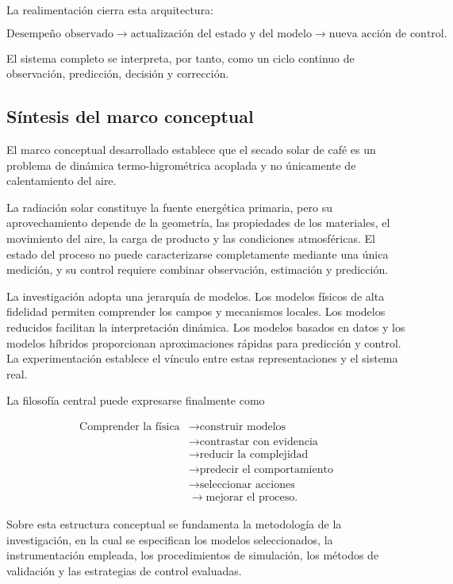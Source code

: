 La realimentación cierra esta arquitectura:

\begin{equation}
\boxed{
\text{Desempeño observado}
\longrightarrow
\text{actualización del estado y del modelo}
\longrightarrow
\text{nueva acción de control}.
}
\end{equation}

El sistema completo se interpreta, por tanto, como un ciclo continuo de observación, predicción, decisión y corrección.

\subsection{Síntesis del marco conceptual}
\label{subsec:sintesis_marco_conceptual}

El marco conceptual desarrollado establece que el secado solar de café es un problema de dinámica termo-higrométrica acoplada y no únicamente de calentamiento del aire.

La radiación solar constituye la fuente energética primaria, pero su aprovechamiento depende de la geometría, las propiedades de los materiales, el movimiento del aire, la carga de producto y las condiciones atmosféricas. El estado del proceso no puede caracterizarse completamente mediante una única medición, y su control requiere combinar observación, estimación y predicción.

La investigación adopta una jerarquía de modelos. Los modelos físicos de alta fidelidad permiten comprender los campos y mecanismos locales. Los modelos reducidos facilitan la interpretación dinámica. Los modelos basados en datos y los modelos híbridos proporcionan aproximaciones rápidas para predicción y control. La experimentación establece el vínculo entre estas representaciones y el sistema real.

La filosofía central puede expresarse finalmente como

\begin{equation}
\boxed{
\begin{aligned}
\text{Comprender la física}
&\longrightarrow
\text{construir modelos}
\\
&\longrightarrow
\text{contrastar con evidencia}
\\
&\longrightarrow
\text{reducir la complejidad}
\\
&\longrightarrow
\text{predecir el comportamiento}
\\
&\longrightarrow
\text{seleccionar acciones}
\\
&\longrightarrow
\text{mejorar el proceso}.
\end{aligned}
}
\label{eq:cierre_marco_conceptual}
\end{equation}

Sobre esta estructura conceptual se fundamenta la metodología de la investigación, en la cual se especifican los modelos seleccionados, la instrumentación empleada, los procedimientos de simulación, los métodos de validación y las estrategias de control evaluadas.